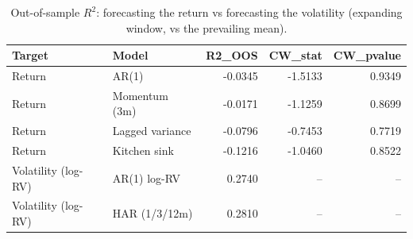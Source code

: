 \begin{table}[htbp]
\centering
\caption{Out-of-sample $R^2$: forecasting the return vs forecasting the volatility (expanding window, vs the prevailing mean).}
\label{tab:predictability}
\small
\begin{tabular}{llrrr}
\toprule
Target & Model & R2\_OOS & CW\_stat & CW\_pvalue \\
\midrule
Return & AR(1) & -0.0345 & -1.5133 & 0.9349 \\
Return & Momentum (3m) & -0.0171 & -1.1259 & 0.8699 \\
Return & Lagged variance & -0.0796 & -0.7453 & 0.7719 \\
Return & Kitchen sink & -0.1216 & -1.0460 & 0.8522 \\
Volatility (log-RV) & AR(1) log-RV & 0.2740 & -- & -- \\
Volatility (log-RV) & HAR (1/3/12m) & 0.2810 & -- & -- \\
\bottomrule
\end{tabular}
\end{table}
